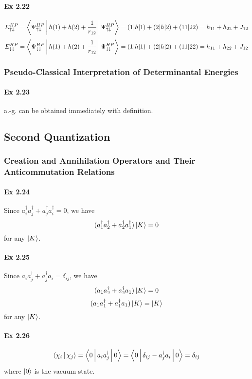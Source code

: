\documentclass[a4paper]{article}
\newcommand{\ex}[1]{\paragraph{Ex #1}}
\numberwithin{equation}{subsection}
\begin{document}
\ex{2.22}
\begin{equation}\label{key}
E_{\uparrow\downarrow}^{HP} = \Braket{\Psi_{\uparrow\downarrow}^{HP} | h(1) + h(2) + \dfrac{1}{r_{12}} | \Psi_{\uparrow\downarrow}^{HP}} = (1|h|1)+(2|h|2)+(11|22) = h_{11}+h_{22}+J_{12}
\end{equation}
\begin{equation}\label{key}
E_{\downarrow\downarrow}^{HP} = \Braket{\Psi_{\downarrow\downarrow}^{HP} | h(1) + h(2) + \dfrac{1}{r_{12}} | \Psi_{\downarrow\downarrow}^{HP}} = (1|h|1)+(2|h|2)+(11|22) = h_{11}+h_{22}+J_{12}
\end{equation}

\subsubsection{Pseudo-Classical Interpretation of Determinantal Energies}
\ex{2.23}
a.-g. can be obtained immediately with definition.

\subsection{Second Quantization}
\subsubsection{Creation and Annihilation Operators and Their Anticommutation Relations}
\ex{2.24}
Since $ a_i^\dagger a_j^\dagger + a_j^\dagger a_i^\dagger = 0 $, we have
\begin{equation}\label{key}
(a_1^\dagger a_2^\dagger + a_2^\dagger a_1^\dagger)\ket{K} = 0
\end{equation}
for any $ \ket{K} $.

\ex{2.25}
Since $ a_i a_j^\dagger + a_j^\dagger a_i = \delta_{ij} $, we have
\begin{equation}\label{key}
(a_1 a_2^\dagger + a_2^\dagger a_1)\ket{K} = 0
\end{equation}
\begin{equation}\label{key}
(a_1 a_1^\dagger + a_1^\dagger a_1)\ket{K} = \ket{K}
\end{equation}
for any $ \ket{K} $.

\ex{2.26}
\begin{equation}\label{key}
\Braket{\chi_i|\chi_j} = \Braket{0 | a_i a_j^\dagger | 0} = \Braket{0 | \delta_{ij} - a_j^\dagger a_i | 0} = \delta_{ij}
\end{equation}
where $ \ket{0} $ is the vacuum state.
\end{document}

